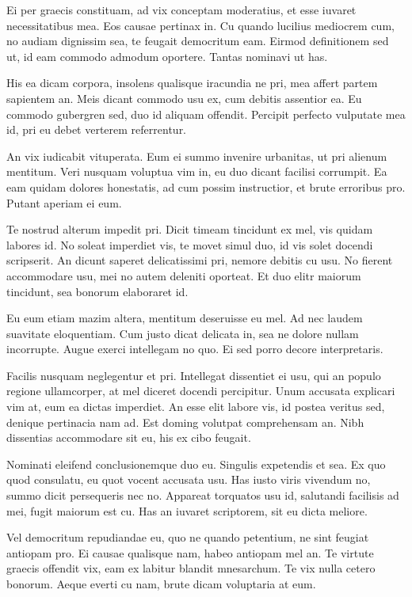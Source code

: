 Ei per graecis constituam, ad vix conceptam moderatius, et esse iuvaret necessitatibus mea. Eos causae pertinax in. Cu quando lucilius mediocrem cum, no audiam dignissim sea, te feugait democritum eam. Eirmod definitionem sed ut, id eam commodo admodum oportere. Tantas nominavi ut has.

His ea dicam corpora, insolens qualisque iracundia ne pri, mea affert partem sapientem an. Meis dicant commodo usu ex, cum debitis assentior ea. Eu commodo gubergren sed, duo id aliquam offendit. Percipit perfecto vulputate mea id, pri eu debet verterem referrentur.

An vix iudicabit vituperata. Eum ei summo invenire urbanitas, ut pri alienum mentitum. Veri nusquam voluptua vim in, eu duo dicant facilisi corrumpit. Ea eam quidam dolores honestatis, ad cum possim instructior, et brute erroribus pro. Putant aperiam ei eum.

Te nostrud alterum impedit pri. Dicit timeam tincidunt ex mel, vis quidam labores id. No soleat imperdiet vis, te movet simul duo, id vis solet docendi scripserit. An dicunt saperet delicatissimi pri, nemore debitis cu usu. No fierent accommodare usu, mei no autem deleniti oporteat. Et duo elitr maiorum tincidunt, sea bonorum elaboraret id.

Eu eum etiam mazim altera, mentitum deseruisse eu mel. Ad nec laudem suavitate eloquentiam. Cum justo dicat delicata in, sea ne dolore nullam incorrupte. Augue exerci intellegam no quo. Ei sed porro decore interpretaris.

Facilis nusquam neglegentur et pri. Intellegat dissentiet ei usu, qui an populo regione ullamcorper, at mel diceret docendi percipitur. Unum accusata explicari vim at, eum ea dictas imperdiet. An esse elit labore vis, id postea veritus sed, denique pertinacia nam ad. Est doming volutpat comprehensam an. Nibh dissentias accommodare sit eu, his ex cibo feugait.

Nominati eleifend conclusionemque duo eu. Singulis expetendis et sea. Ex quo quod consulatu, eu quot vocent accusata usu. Has iusto viris vivendum no, summo dicit persequeris nec no. Appareat torquatos usu id, salutandi facilisis ad mei, fugit maiorum est cu. Has an iuvaret scriptorem, sit eu dicta meliore.

Vel democritum repudiandae eu, quo ne quando petentium, ne sint feugiat antiopam pro. Ei causae qualisque nam, habeo antiopam mel an. Te virtute graecis offendit vix, eam ex labitur blandit mnesarchum. Te vix nulla cetero bonorum. Aeque everti cu nam, brute dicam voluptaria at eum.

